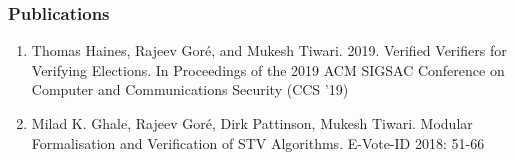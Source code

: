 \documentclass{beamer}
\begin{document}
\begin{frame}
\frametitle{Publications}
\begin{enumerate}
	 
	\item Thomas Haines, Rajeev Goré, and Mukesh Tiwari. 2019. Verified Verifiers for Verifying Elections. 
	 In Proceedings of the 2019 ACM SIGSAC Conference on Computer and Communications Security (CCS '19)
	 
	 \item Milad K. Ghale, Rajeev Goré, Dirk Pattinson, Mukesh Tiwari.
	Modular Formalisation and Verification of STV Algorithms. E-Vote-ID 2018: 51-66
	\end{enumerate}
\end{frame}
%
%
%
%
\end{document}
